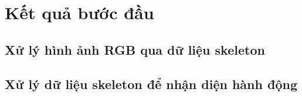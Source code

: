 \section{Kết quả bước đầu}
\label{section:result}
\subsection{Xử lý hình ảnh RGB qua dữ liệu skeleton}

\subsection{Xử lý dữ liệu skeleton để nhận diện hành động}


